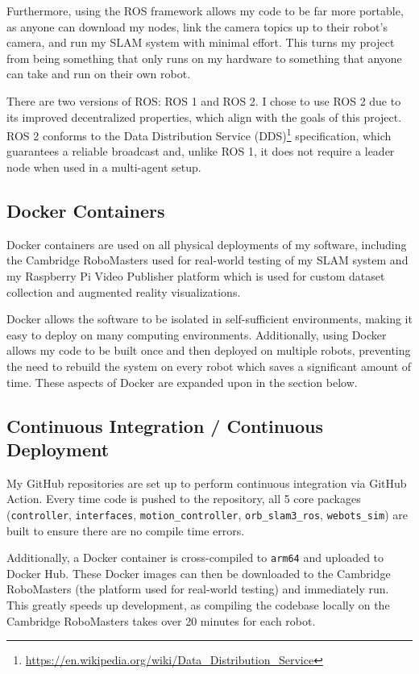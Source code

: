 Furthermore, using the ROS framework allows my code to be far more portable, as anyone can download my nodes, link the camera topics up to their robot's camera, and run my SLAM system with minimal effort. This turns my project from being something that only runs on my hardware to something that anyone can take and run on their own robot.

There are two versions of ROS: ROS 1 and ROS 2. I chose to use ROS 2 due to its improved decentralized properties, which align with the goals of this project. ROS 2 conforms to the Data Distribution Service (DDS)\footnote[1]{\url{https://en.wikipedia.org/wiki/Data_Distribution_Service}} specification, which guarantees a reliable broadcast and, unlike ROS 1, it does not require a leader node when used in a multi-agent setup.

\subsection{Docker Containers}
\label{sec:docker-containers}
Docker containers are used on all physical deployments of my software, including the Cambridge RoboMasters used for real-world testing of my SLAM system and my Raspberry Pi Video Publisher platform which is used for custom dataset collection and augmented reality visualizations.

Docker allows the software to be isolated in self-sufficient environments, making it easy to deploy on many computing environments. Additionally, using Docker allows my code to be built once and then deployed on multiple robots, preventing the need to rebuild the system on every robot which saves a significant amount of time. These aspects of Docker are expanded upon in the section below.

\subsection{Continuous Integration / Continuous Deployment}
\label{sec:cicd}
My GitHub repositories are set up to perform continuous integration via GitHub Action. Every time code is pushed to the repository, all 5 core packages (\texttt{controller}, \texttt{interfaces}, \texttt{motion\_controller}, \texttt{orb\_slam3\_ros}, \texttt{webots\_sim}) are built to ensure there are no compile time errors.

Additionally, a Docker container is cross-compiled to \texttt{arm64} and uploaded to Docker Hub. These Docker images can then be downloaded to the Cambridge RoboMasters (the platform used for real-world testing) and immediately run. This greatly speeds up development, as compiling the codebase locally on the Cambridge RoboMasters takes over 20 minutes for each robot.

